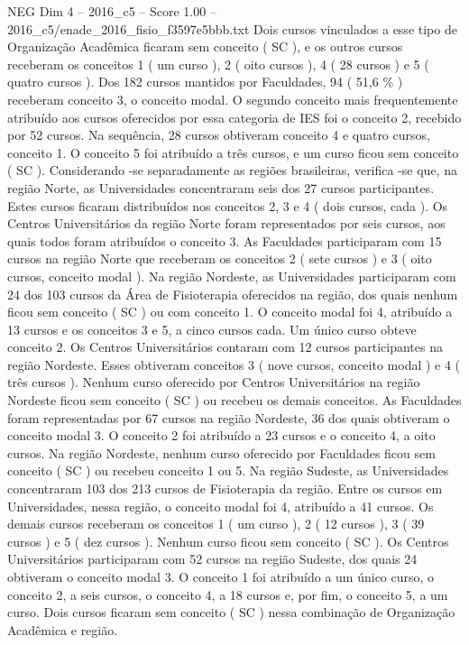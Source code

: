 \begin{textsample}{NEG Dim 4 – 2016\_c5 – Score 1.00 – 2016\_c5/enade\_2016\_fisio\_f3597e5bbb.txt}
Dois cursos vinculados a esse tipo de Organização Acadêmica ficaram sem conceito ( SC ), e os outros cursos receberam os conceitos 1 ( um curso ), 2 ( oito cursos ), 4 ( 28 cursos ) e 5 ( quatro cursos ).
Dos 182 cursos mantidos por Faculdades, 94 ( 51,6 \% ) receberam conceito 3, o conceito modal.
O segundo conceito mais frequentemente atribuído aos cursos oferecidos por essa categoria de IES foi o conceito 2, recebido por 52 cursos.
Na sequência, 28 cursos obtiveram conceito 4 e quatro cursos, conceito 1.
O conceito 5 foi atribuído a três cursos, e um curso ficou sem conceito ( SC ).
Considerando -se separadamente as regiões brasileiras, verifica -se que, na região Norte, as Universidades concentraram seis dos 27 cursos participantes.
Estes cursos ficaram distribuídos nos conceitos 2, 3 e 4 ( dois cursos, cada ).
Os Centros Universitários da região Norte foram representados por seis cursos, aos quais todos foram atribuídos o conceito 3.
As Faculdades participaram com 15 cursos na região Norte que receberam os conceitos 2 ( sete cursos ) e 3 ( oito cursos, conceito modal ).
Na região Nordeste, as Universidades participaram com 24 dos 103 cursos da Área de Fisioterapia oferecidos na região, dos quais nenhum ficou sem conceito ( SC ) ou com conceito 1.
O conceito modal foi 4, atribuído a 13 cursos e os conceitos 3 e 5, a cinco cursos cada.
Um único curso obteve conceito 2.
Os Centros Universitários contaram com 12 cursos participantes na região Nordeste.
Esses obtiveram conceitos 3 ( nove cursos, conceito modal ) e 4 ( três cursos ).
Nenhum curso oferecido por Centros Universitários na região Nordeste ficou sem conceito ( SC ) ou recebeu os demais conceitos.
As Faculdades foram representadas por 67 cursos na região Nordeste, 36 dos quais obtiveram o conceito modal 3.
O conceito 2 foi atribuído a 23 cursos e o conceito 4, a oito cursos.
Na região Nordeste, nenhum curso oferecido por Faculdades ficou sem conceito ( SC ) ou recebeu conceito 1 ou 5.
Na região Sudeste, as Universidades concentraram 103 dos 213 cursos de Fisioterapia da região.
Entre os cursos em Universidades, nessa região, o conceito modal foi 4, atribuído a 41 cursos.
Os demais cursos receberam os conceitos 1 ( um curso ), 2 ( 12 cursos ), 3 ( 39 cursos ) e 5 ( dez cursos ).
Nenhum curso ficou sem conceito ( SC ).
Os Centros Universitários participaram com 52 cursos na região Sudeste, dos quais 24 obtiveram o conceito modal 3.
O conceito 1 foi atribuído a um único curso, o conceito 2, a seis cursos, o conceito 4, a 18 cursos e, por fim, o conceito 5, a um curso.
Dois cursos ficaram sem conceito ( SC ) nessa combinação de Organização Acadêmica e região.

\end{textsample}
